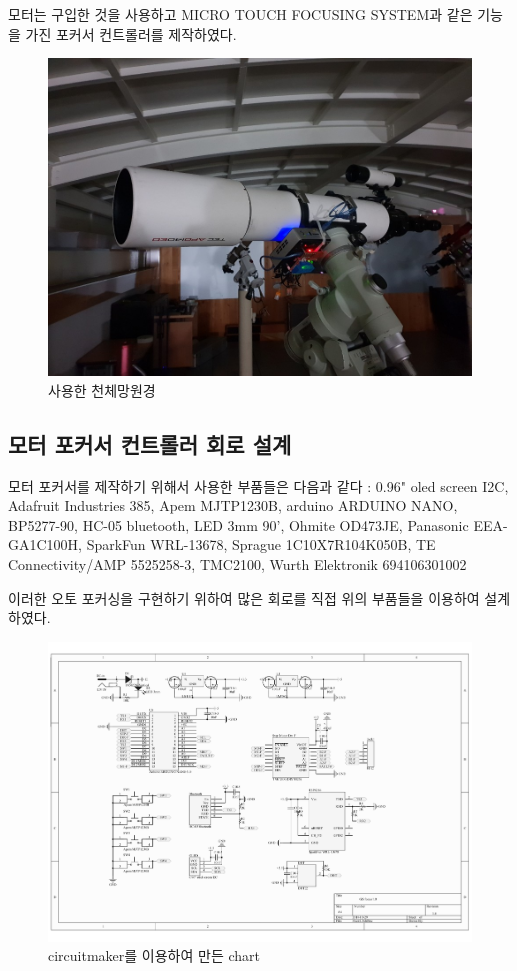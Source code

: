 \documentclass{abstract_hutech}
\begin{document}
모터는 구입한 것을 사용하고 MICRO TOUCH FOCUSING SYSTEM과 같은 기능을 가진 포커서 컨트롤러를 제작하였다.
\begin{figure}[h]
	\centering
	\includegraphics[width=1\linewidth]{telescope}
	\caption{사용한 천체망원경}
	\label{fig:telescope}
\end{figure}

\subsection{모터 포커서 컨트롤러 회로 설계}

모터 포커서를 제작하기 위해서 사용한 부품들은 다음과 같다 : 0.96" oled screen I2C, Adafruit Industries 385, Apem MJTP1230B, arduino ARDUINO NANO, BP5277-90, HC-05 bluetooth, LED 3mm 90', Ohmite OD473JE, Panasonic EEA-GA1C100H, SparkFun WRL-13678, Sprague 1C10X7R104K050B, TE Connectivity/AMP 5525258-3, TMC2100, Wurth Elektronik 694106301002

이러한 오토 포커싱을 구현하기 위하여 많은 회로를 직접 위의 부품들을 이용하여 설계하였다.

\begin{figure}[h]
	\centering
	\includegraphics[width=1\linewidth]{Schematic_Prints}
	\caption{circuitmaker를 이용하여 만든 chart}
	\label{fig:Schematic_Prints}
\end{figure}
\end{document}
